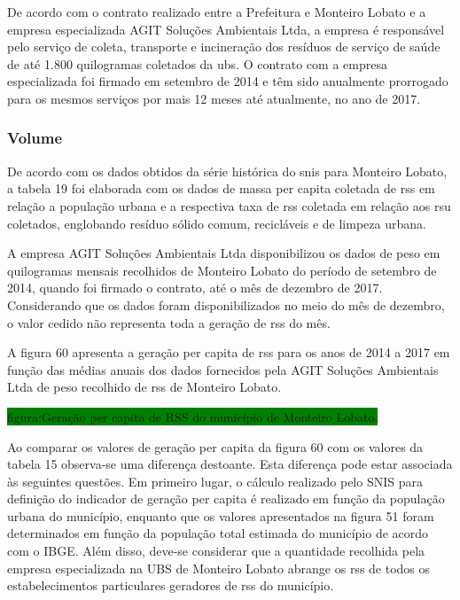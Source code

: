 	De acordo com o contrato realizado entre a Prefeitura e Monteiro Lobato e a empresa especializada AGIT Soluções Ambientais Ltda, a empresa é responsável pelo serviço de coleta, transporte e incineração dos resíduos de serviço de saúde de até 1.800 quilogramas coletados da \acrshort{ubs}.
	O contrato com a empresa especializada foi firmado em setembro de 2014 e têm sido anualmente prorrogado para os mesmos serviços por mais 12 meses até atualmente, no ano de 2017.
	
	\subsubsection{Volume}
	De acordo com os dados obtidos da série histórica do \gls{snis} para Monteiro Lobato, a tabela 19 foi elaborada com os dados de massa per capita coletada de \gls{rss} em relação a população urbana e a respectiva taxa de \gls{rss} coletada em relação aos \gls{rsu} coletados, englobando resíduo sólido comum, recicláveis e de limpeza urbana.
	
	
	
	A empresa AGIT Soluções Ambientais Ltda disponibilizou os dados de peso em quilogramas mensais recolhidos de Monteiro Lobato do período de setembro de 2014, quando foi firmado o contrato, até o mês de dezembro de 2017. Considerando que os dados foram disponibilizados no meio do mês de dezembro, o valor cedido não representa toda a geração de \gls{rss} do mês.
	
	A figura 60 apresenta a geração per capita de \gls{rss} para os anos de 2014 a 2017 em função das médias anuais dos dados fornecidos pela AGIT Soluções Ambientais Ltda de peso recolhido de \gls{rss} de Monteiro Lobato.
	
	\colorbox{green}{figura:Geração per capita de RSS do município de Monteiro Lobato.}
	
	Ao comparar os valores de geração per capita da figura 60 com os valores da tabela 15 observa-se uma diferença destoante. Esta diferença pode estar associada às seguintes questões. Em primeiro lugar, o cálculo realizado pelo SNIS para definição do indicador de geração per capita é realizado em função da população urbana do município, enquanto que os valores apresentados na figura 51 foram determinados em função da população total estimada do município de acordo com o IBGE. Além disso, deve-se considerar que a quantidade recolhida pela empresa especializada na UBS de Monteiro Lobato abrange os \gls{rss} de todos os estabelecimentos particulares geradores de \gls{rss} do município. 
	
